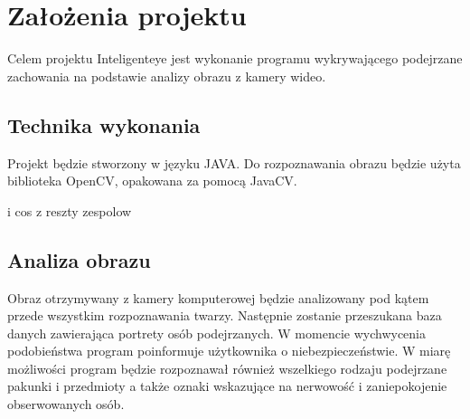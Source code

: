 \section{Założenia projektu}
Celem projektu Inteligenteye jest wykonanie programu wykrywającego podejrzane zachowania na podstawie analizy obrazu z kamery wideo.

\subsection{Technika wykonania}
Projekt będzie stworzony w języku JAVA. Do rozpoznawania obrazu będzie użyta biblioteka OpenCV, opakowana za pomocą JavaCV. 


i cos z reszty zespolow

\subsection{Analiza obrazu}
Obraz otrzymywany z kamery komputerowej będzie analizowany pod kątem przede wszystkim rozpoznawania twarzy. Następnie zostanie przeszukana baza danych zawierająca portrety osób podejrzanych. W momencie wychwycenia podobieństwa program poinformuje użytkownika o niebezpieczeństwie. W miarę możliwości program będzie rozpoznawał również wszelkiego rodzaju podejrzane pakunki i przedmioty a także oznaki wskazujące na nerwowość i zaniepokojenie obserwowanych osób.


